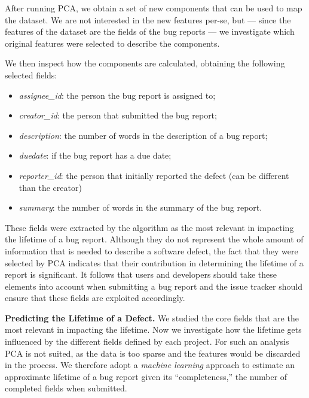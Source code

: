 After running PCA, we obtain a set of new components that can be used to map the dataset. We are not interested in the new features per-se, but --- since the features of the dataset are the fields of the bug reports --- we investigate which original features were selected to describe the components. 

We then inspect how the components are calculated, obtaining the following selected fields:

\begin{itemize}[$\circ$]
  \item \emph{assignee\_id}: the person the bug report is assigned to;
  \item \emph{creator\_id}: the person that submitted the bug report;
  \item \emph{description}: the number of words in the description of a bug report;
  \item \emph{duedate}: if the bug report has a due date;
  \item \emph{reporter\_id}: the person that initially reported the defect (can be different than the creator)
  \item \emph{summary}: the number of words in the summary of the bug report.
\end{itemize}

These fields were extracted by the algorithm as the most relevant in impacting the lifetime of a bug report. Although they do not represent the whole amount of information that is needed to describe a software defect, the fact that they were selected by PCA indicates that their contribution in determining the lifetime of a report is significant. It follows that users and developers should take these elements into account when submitting a bug report and the issue tracker should ensure that these fields are exploited accordingly.

{\bfseries Predicting the Lifetime of a Defect.} We studied the core fields that are the most relevant in impacting the lifetime. Now we investigate how the lifetime gets influenced by the different fields defined by each project. For such an analysis PCA is not suited, as the data is too sparse and the features would be discarded in the process. We therefore adopt a \emph{machine learning} approach to estimate an approximate lifetime of a bug report given its ``completeness,'' \ie the number of completed fields when submitted.

